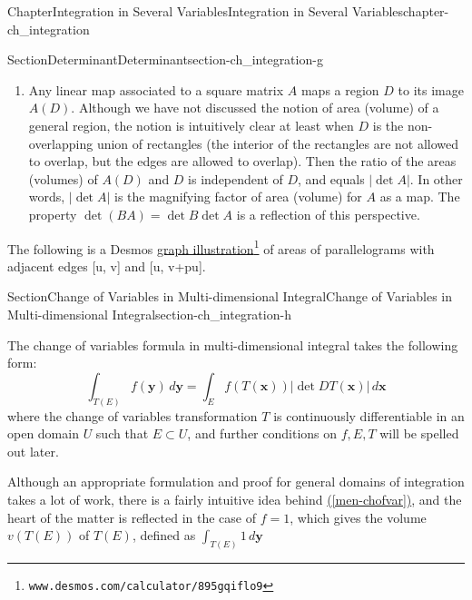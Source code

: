 \documentclass[oneside,10pt,]{book}
\newcommand{\xreffont}{\relax}
\numberwithin{equation}{section}
\newcommand{\bx}{\mathbf{x}}
\begin{document}
\begin{chapterptx}{Chapter}{Integration in Several Variables}{}{Integration in Several Variables}{}{}{chapter-ch_integration}
\begin{sectionptx}{Section}{Determinant}{}{Determinant}{}{}{section-ch_integration-g}
\begin{enumerate}
\begin{enumerate}[label=(\roman*)]
\end{enumerate}
An equivalent way of stating property (ii) is that \(\det A=0\) iff the system \(A\bx =\mathbf 0\) has a non-zero solution.%
\item{}Any linear map associated to a square matrix \(A\) maps a region \(D\) to its image \(A(D)\). Although we have not discussed the notion of  area (volume) of a general region, the notion is intuitively clear at least when \(D\) is the non-overlapping union of rectangles (the interior of the rectangles are not allowed to overlap, but the edges are allowed to overlap). Then the ratio of the  areas (volumes) of  \(A(D)\) and \(D\) is independent of \(D\), and equals \(|\det A|\). In other words, \(|\det A|\) is the magnifying factor of    area (volume) for \(A\) as a map. The property \(\det (BA)=\det B \det A\) is a reflection of this perspective.%
\end{enumerate}
%
\par
The following is a Desmos \href{https://www.desmos.com/calculator/895gqiflo9}{graph illustration}\footnote{\nolinkurl{www.desmos.com/calculator/895gqiflo9}\label{fn-ch_integration-g-e-b}}  of areas of parallelograms with adjacent edges [u, v] and [u, v+pu].%
\end{sectionptx}
%
%
\typeout{************************************************}
\typeout{************************************************}
%
\begin{sectionptx}{Section}{Change of Variables in Multi-dimensional Integral}{}{Change of Variables in Multi-dimensional Integral}{}{}{section-ch_integration-h}
\begin{introduction}{}%
The change of variables formula in multi-dimensional integral takes the following form:%
\begin{equation}
\int_{T(E)} f({\mathbf y})\, d{\mathbf y} = \int_{E} f(T({\mathbf x}))|\det DT({\mathbf x})|\, d{\mathbf x}\label{men-chofvar}
\end{equation}
where the change of variables transformation \(T\) is continuously differentiable in an open domain \(U\) such that \(E\subset U\), and further conditions on \(f, E, T\) will be spelled out later.%
\par
Although an appropriate formulation and proof for general domains of integration takes a lot of work, there is a fairly intuitive idea behind \hyperref[men-chofvar]{({\xreffont\ref{men-chofvar}})}, and the heart of  the matter is reflected in the case of \(f=1\), which gives the volume  \(v(T(E))\) of \(T(E)\), defined as \(\int_{T(E)}1\, d{\mathbf y}\)%

\end{introduction}
\end{sectionptx}
\end{chapterptx}
\end{document}
